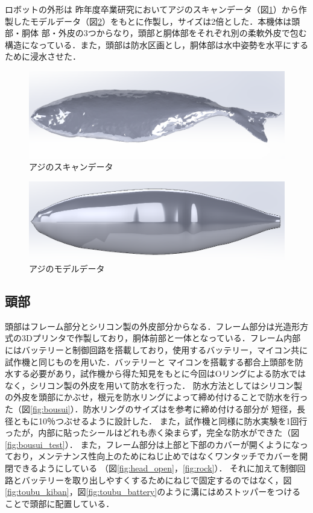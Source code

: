 ロボットの外形は
昨年度卒業研究においてアジのスキャンデータ（図\ref{fig:data_scan}）から作製したモデルデータ（図\ref{fig:data_model}）をもとに作製し，サイズは2倍とした．本機体は頭部・胴体
部・外皮の3つからなり，頭部と胴体部をそれぞれ別の柔軟外皮で包む構造になっている．また，頭部は防水区画とし，胴体部は水中姿勢を水平にするために浸水させた．

\begin{figure}[t]
    \centering
    \includegraphics[width=0.7\linewidth]{chapters/picture/scan.png}
    \caption{アジのスキャンデータ}
    \label{fig:data_scan}
\end{figure}
\begin{figure}[t]
    \centering
    \includegraphics[width=0.7\linewidth]{chapters/picture/fishkinji2.png}
    \caption{アジのモデルデータ}
    \label{fig:data_model}
\end{figure}

\subsection{頭部}
頭部はフレーム部分とシリコン製の外皮部分からなる．フレーム部分は光造形方式の3Dプリンタで作製しており，胴体前部と一体となっている．フレーム内部にはバッテリーと制御回路を搭載しており，使用するバッテリー，マイコン共に試作機と同じものを用いた．バッテリーと
マイコンを搭載する都合上頭部を防水する必要があり，試作機から得た知見をもとに今回はOリングによる防水ではなく，シリコン製の外皮を用いて防水を行った．
防水方法としてはシリコン製の外皮を頭部にかぶせ，根元を防水リングによって締め付けることで防水を行った（図\ref{fig:bousui}）．防水リングのサイズは\cite{juuiti}を参考に締め付ける部分が
短径，長径ともに10％つぶせるように設計した．
また，試作機と同様に防水実験を1回行ったが，内部に貼ったシールはどれも赤く染まらず，完全な防水ができた（図\ref{fig:bousui_test}）．
また，フレーム部分は上部と下部のカバーが開くようになっており，メンテナンス性向上のためにねじ止めではなくワンタッチでカバーを開閉できるようにしている
（図\ref{fig:head_open}，\ref{fig:rock}）．
それに加えて制御回路とバッテリーを取り出しやすくするためにねじで固定するのではなく，図\ref{fig:toubu_kiban}，図\ref{fig:toubu_battery}のように溝にはめストッパーをつける
ことで頭部に配置している．

